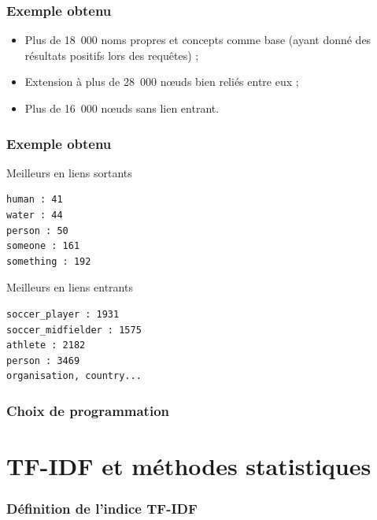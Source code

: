 \documentclass[12pt, handout]{beamer}
\begin{document}
\begin{frame}
  \frametitle{Exemple obtenu}
  
  \begin{itemize}
   \item Plus de 18~000 noms propres et concepts comme base (ayant donné des résultats positifs lors des requêtes) ;
   \item Extension à plus de 28~000 n\oe uds bien reliés entre eux ;
   \item Plus de 16~000 n\oe uds sans lien entrant.
  \end{itemize}

  
\end{frame}

\begin{frame}[fragile]
 \frametitle{Exemple obtenu}
 
 \begin{block}{Meilleurs en liens sortants}
  \begin{verbatim}
human : 41
water : 44
person : 50
someone : 161
something : 192 
  \end{verbatim}
 \end{block}

  \begin{block}{Meilleurs en liens entrants}
    \begin{verbatim}
soccer_player : 1931
soccer_midfielder : 1575
athlete : 2182
person : 3469
organisation, country...
    \end{verbatim}
  \end{block}
\end{frame}


\begin{frame}
 \frametitle{Choix de programmation}
 
 
\end{frame}



\section{TF-IDF et méthodes statistiques}


\begin{frame}
 \frametitle{Définition de l'indice TF-IDF}
 
 
\end{frame}
\end{document}
